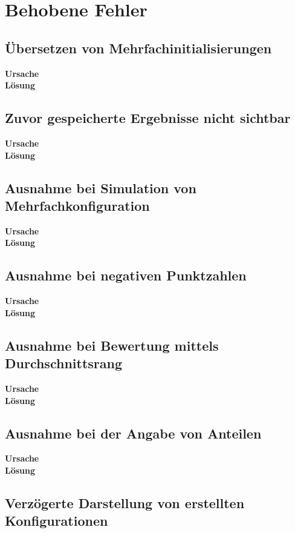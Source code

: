 \section{Behobene Fehler}

\subsection{Übersetzen von Mehrfachinitialisierungen}

\textbf{Ursache}\\
\textbf{Lösung}

\subsection{Zuvor gespeicherte Ergebnisse nicht sichtbar}

\textbf{Ursache}\\
\textbf{Lösung}

\subsection{Ausnahme bei Simulation von Mehrfachkonfiguration}

\textbf{Ursache}\\
\textbf{Lösung}

\subsection{Ausnahme bei negativen Punktzahlen}

\textbf{Ursache}\\
\textbf{Lösung}

\subsection{Ausnahme bei Bewertung mittels Durchschnittsrang}

\textbf{Ursache}\\
\textbf{Lösung}

\subsection{Ausnahme bei der Angabe von Anteilen}

\textbf{Ursache}\\
\textbf{Lösung}

\subsection{Verzögerte Darstellung von erstellten Konfigurationen}

